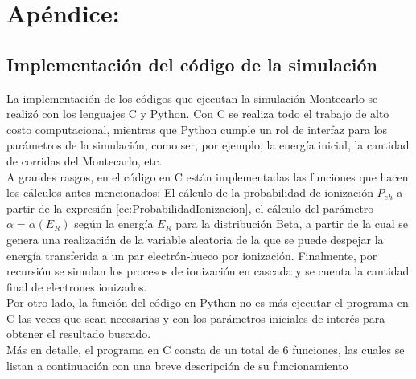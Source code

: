 \chapter*{Apéndice:}
\section*{Implementación del código de la simulación}
\noindent La implementación de los códigos que ejecutan la simulación Montecarlo se realizó con los lenguajes C y Python. Con C se realiza todo el trabajo de alto costo computacional, mientras que Python cumple un rol de interfaz para los parámetros de la simulación, como ser, por ejemplo, la energía inicial, la cantidad de corridas del Montecarlo, etc.\\
\indent A grandes rasgos, en el código en C están implementadas las funciones que hacen los cálculos antes mencionados: El cálculo de la probabilidad de ionización $P_{eh}$ a partir de la expresión \eqref{ec:ProbabilidadIonizacion}, el cálculo del parámetro $\alpha = \alpha(E_{R})$ según la energía $E_{R}$ para la distribución Beta, a partir de la cual se genera una realización de la variable aleatoria de la que se puede despejar la energía transferida a un par electrón-hueco por ionización. Finalmente, por recursión se simulan los procesos de ionización en cascada y se cuenta la cantidad final de electrones ionizados.\\
\indent Por otro lado, la función del código en Python no es más ejecutar el programa en C las veces que sean necesarias y con los parámetros iniciales de interés para obtener el resultado buscado.\\
\indent Más en detalle, el programa en C consta de un total de $6$ funciones, las cuales se listan a continuación con una breve descripción de su funcionamiento
